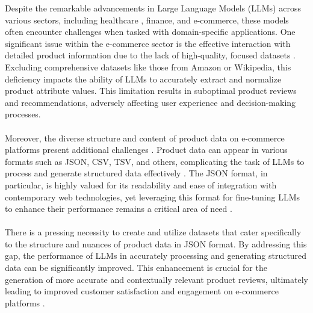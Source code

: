 \label{section:problema}
Despite the remarkable advancements in Large Language Models (LLMs) across various sectors, including healthcare \cite{mumtaz2024llmshealthcare,10.1093/bioinformatics/btz682}, finance\cite{zhao2024revolutionizing}, and e-commerce, these models often encounter challenges when tasked with domain-specific applications. One significant issue within the e-commerce sector is the effective interaction with detailed product information due to the lack of high-quality, focused datasets \cite{macková2023promap}. Excluding comprehensive datasets like those from Amazon or Wikipedia, this deficiency impacts the ability of LLMs to accurately extract and normalize product attribute values. This limitation results in suboptimal product reviews and recommendations, adversely affecting user experience and decision-making processes.
\\\\
Moreover, the diverse structure and content of product data on e-commerce platforms present additional challenges \cite{liu2019roberta}. Product data can appear in various formats such as JSON, CSV, TSV, and others, complicating the task of LLMs to process and generate structured data effectively \cite{rfc8259}. The JSON format, in particular, is highly valued for its readability and ease of integration with contemporary web technologies, yet leveraging this format for fine-tuning LLMs to enhance their performance remains a critical area of need \cite{ling2024domain}.
\\\\
There is a pressing necessity to create and utilize datasets that cater specifically to the structure and nuances of product data in JSON format. By addressing this gap, the performance of LLMs in accurately processing and generating structured data can be significantly improved. This enhancement is crucial for the generation of more accurate and contextually relevant product reviews, ultimately leading to improved customer satisfaction and engagement on e-commerce platforms \cite{vaswani2023attention}.